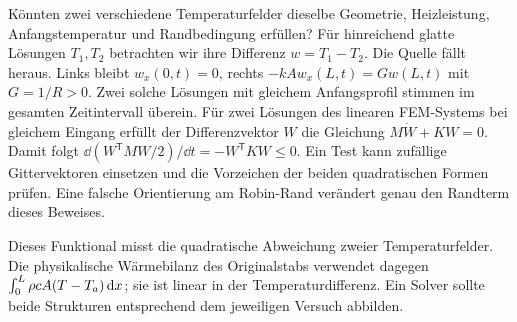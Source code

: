 Könnten zwei verschiedene Temperaturfelder dieselbe Geometrie, Heizleistung, Anfangstemperatur und Randbedingung erfüllen? Für hinreichend glatte Lösungen \(T_1,T_2\) betrachten wir ihre Differenz \(w=T_1-T_2\). Die Quelle fällt heraus. Links bleibt \(w_x(0,t)=0\), rechts \(-kAw_x(L,t)=G w(L,t)\) mit \(G=1/R>0\).
Zwei solche Lösungen mit gleichem Anfangsprofil stimmen im gesamten Zeitintervall überein.
Für zwei Lösungen des linearen FEM-Systems bei gleichem Eingang erfüllt der Differenzvektor \(W\) die Gleichung \(M\dot W+KW=0\). Damit folgt \(\dd(W^\mathsf TMW/2)/\dd t=-W^\mathsf TKW\le0\). Ein Test kann zufällige Gittervektoren einsetzen und die Vorzeichen der beiden quadratischen Formen prüfen. Eine falsche Orientierung am Robin-Rand verändert genau den Randterm dieses Beweises.

Dieses Funktional misst die quadratische Abweichung zweier Temperaturfelder. Die physikalische Wärmebilanz des Originalstabs verwendet dagegen \(\int_0^L \rho c A(T-T_a)\,\mathrm{d} x\); sie ist linear in der Temperaturdifferenz. Ein Solver sollte beide Strukturen entsprechend dem jeweiligen Versuch abbilden.


